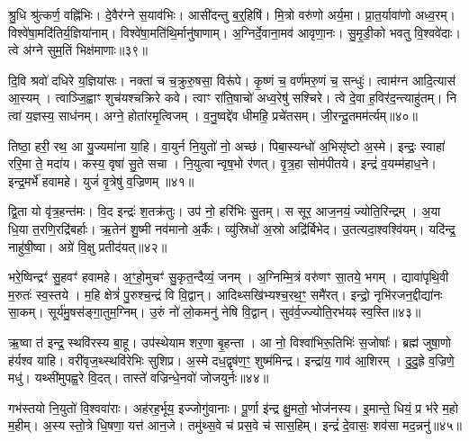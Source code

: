 श्रु॒धि श्रु॑त्कर्ण॒ वह्नि॑भिः।
दे॒वैर॑ग्ने स॒याव॑भिः।
आसी॑दन्तु ब॒र्॒हिषि॑।
मि॒त्रो वरु॑णो अर्य॒मा।
प्रा॒त॒र्यावा॑णो अध्व॒रम्।
विश्वे॑षा॒मदि॑तिर्य॒ज्ञिया॑नाम्।
विश्वे॑षा॒मति॑थि॒र्मानु॑षाणाम्।
अ॒ग्निर्दे॒वाना॒मव॑ आवृणा॒नः।
सु॒मृ॒डी॒को भवतु वि॒श्ववे॑दाः।
त्वे अ॑ग्ने सुम॒तिं भिक्ष॑माणाः॥३९॥

दि॒वि श्रवो॑ दधिरे य॒ज्ञिया॑सः।
नक्ता॑ च च॒क्रुरु॒षसा॒ विरू॑पे।
कृ॒ष्णं च॒ वर्ण॑मरु॒णं च॒ सन्धुः॑।
त्वाम॑ग्न आदि॒त्यास॑ आ॒स्यम्।
त्वाञ्जि॒ह्वाꣳ शुच॑यश्चक्रिरे कवे।
त्वाꣳ रा॑ति॒षाचो॑ अध्व॒रेषु॑ सश्चिरे।
त्वे दे॒वा ह॒विर॑द॒न्त्याहु॑तम्।
नि त्वा॑ य॒ज्ञस्य॒ साध॑नम्।
अग्ने॒ होता॑रमृ॒त्विजम्।
व॒नु॒ष्वद्दे॑व धीमहि॒ प्रचे॑तसम्।
जी॒रन्दू॒तमम॑र्त्यम्॥४०॥\anuvakamend[य॒ज्ञ॒वा॒ह॒सा॒स॒प॒र्य॒न्व॒यमृ॑द्ध्यां॒ भिक्ष॑माणाः॒ प्रचे॑तस॒मेकं॑ च]

तिष्ठा॒ हरी॒ रथ॒ आ यु॒ज्यमा॑ना या॒हि।
वा॒युर्न नि॒युतो॑ नो॒ अच्छ॑।
पिबा॒स्यन्धो॑ अ॒भिसृ॑ष्टो अ॒स्मे।
इन्द्रः॒ स्वाहा॑ ररि॒मा ते॒ मदा॑य।
कस्य॒ वृषा॑ सु॒ते सचा।
नि॒युत्वान्वृष॒भो र॑णत्।
वृ॒त्र॒हा सोम॑पीतये।
इन्द्रं॑ व॒यम्म॑हाध॒ने।
इन्द्र॒मर्भे॑ हवामहे।
युजं॑ वृ॒त्रेषु॑ व॒ज्रिणम्॥४१॥

द्वि॒ता यो वृ॑त्र॒हन्त॑मः।
वि॒द इन्द्रः॑ श॒तक्र॑तुः।
उप॑ नो॒ हरि॑भिः सु॒तम्।
स सूर॒ आज॒नयं॒ ज्योति॒रिन्द्रम्।
अ॒या धि॒या त॒रणि॒रद्रि॑बर्\mbox{}हाः।
ऋ॒तेन॑ शु॒ष्मी नव॑मानो अ॒र्कैः।
व्यु॑स्रिधो॑ अ॒स्रो अद्रि॑र्बिभेद।
उ॒तत्यदा॒श्वश्वि॑यम्।
यदि॑न्द्र॒ नाहु॑षी॒ष्वा।
अग्रे॑ वि॒क्षु प्रतीद॑यत्॥४२॥

भरे॒ष्विन्द्रꣳ॑ सु॒हवꣳ॑ हवामहे।
अ॒ꣳ॒हो॒मुचꣳ॑ सु॒कृत॒न्दैव्यं॒ जनम्।
अ॒ग्निम्मि॒त्रं वरु॑णꣳ सा॒तये॒ भगम्।
द्यावा॑पृथि॒वी म॒रुतः॑ स्व॒स्तये।
म॒हि क्षेत्रं॑ पु॒रुश्च॒न्द्रं वि वि॒द्वान्।
आदिथ्सखि॑भ्यश्च॒रथ॒ꣳ॒ समै॑रत्।
इन्द्रो॒ नृभि॑रजन॒द्दीद्या॑नः सा॒कम्।
सूर्य॑मु॒षस॑ङ्गा॒तुम॒ग्निम्।
उ॒रुं नो॑ लो॒कमनु॑ नेषि वि॒द्वान्।
सुव॑र्व॒ज्ज्योति॒रभ॑यꣴ स्व॒स्ति॥४३॥

ऋ॒ष्वा त॑ इन्द्र॒ स्थवि॑रस्य बा॒हू।
उप॑स्थेयाम शर॒णा बृ॒हन्ता।
आ नो॒ विश्वा॑भिरू॒तिभिः॑ स॒जोषाः᳚।
ब्रह्म॑ जुषा॒णो ह॑र्यश्व याहि।
वरी॑वृज॒थ्स्थवि॑रेभिः सुशिप्र।
अ॒स्मे दध॒द्वृष॑ण॒ꣳ॒ शुष्म॑मिन्द्र।
इन्द्रा॑य॒ गाव॑ आ॒शिरम्।
दु॒दु॒ह्रे व॒ज्रिणे॒ मधु॑।
यथ्सी॑मुपह्व॒रे वि॒दत्।
तास्ते॑ वज्रिन्धे॒नवो॑ जोजयुर्नः॥४४॥

गभ॑स्तयो नि॒युतो॑ वि॒श्ववा॑राः।
अह॑रह॒र्भूय॒ इज्जोगु॑वानाः।
पू॒र्णा इ॑न्द्र क्षु॒मतो॒ भोज॑नस्य।
इ॒मान्ते॒ धियं॒ प्र भ॑रे म॒हो म॒हीम्।
अ॒स्य स्तो॒त्रे धि॒षणा॒ यत्त॑ आन॒जे।
तमु॑थ्स॒वे च॑ प्रस॒वे च॑ सास॒हिम्।
इन्द्रं॑ दे॒वासः॒ शव॑सा मद॒न्ननु॑॥४५॥\anuvakamend[व॒ज्रिण॑मयथ्स्व॒स्ति जो॑जयुर्नः स॒प्त च॑]


